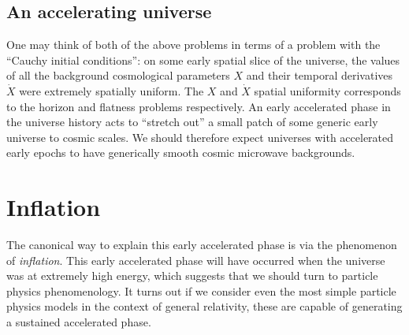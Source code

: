 \subsection{An accelerating universe}
One may think of both of the above problems in terms of a problem with the ``Cauchy initial conditions'': on some early spatial slice of the universe, the values of all the background cosmological parameters \(X\) and their temporal derivatives \(\dot{X}\) were extremely spatially uniform. The \(X\) and \(\dot{X}\) spatial uniformity corresponds to the horizon and flatness problems respectively. An early accelerated phase in the universe history acts to ``stretch out'' a small patch of some generic early universe to cosmic scales. We should therefore expect universes with accelerated early epochs to have generically smooth cosmic microwave backgrounds.

\section{Inflation}
The canonical way to explain this early accelerated phase is via the phenomenon of {\em inflation}. This early accelerated phase will have occurred when the universe was at extremely high energy, which suggests that we should turn to particle physics phenomenology.
It turns out if we consider even the most simple particle physics models in the context of general relativity, these are capable of generating a sustained accelerated phase.

